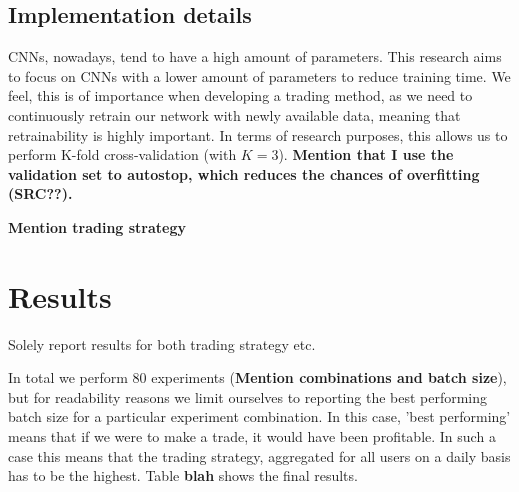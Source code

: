\documentclass{article}
\begin{document}
\subsection{Implementation details}
CNNs, nowadays, tend to have a high amount of parameters. This research aims to focus on CNNs with a lower amount of parameters to reduce training time. We feel, this is of importance when developing a trading method, as we need to continuously retrain our network with newly available data, meaning that retrainability is highly important. In terms of research purposes, this allows us to perform K-fold cross-validation (with $K=3$). \textbf{Mention that I use the validation set to autostop, which reduces the chances of overfitting (\textbf{SRC??}).}

\textbf{Mention trading strategy}

\section{Results}
Solely report results for both trading strategy etc.

In total we perform 80 experiments (\textbf{Mention combinations and batch size}), but for readability reasons we limit ourselves to reporting the best performing batch size for a particular experiment combination. In this case, 'best performing' means that if we were to make a trade, it would have been profitable. In such a case this means that the trading strategy, aggregated for all users on a daily basis has to be the highest. Table \textbf{blah} shows the final results.
\end{document}
